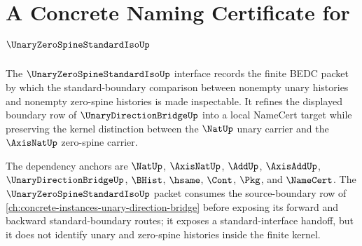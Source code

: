 \chapter{A Concrete Naming Certificate for $\UnaryZeroSpineStandardIsoUp$}
\label{ch:concrete-instances-unary-zero-spine-standard-iso-namecert}

The $\UnaryZeroSpineStandardIsoUp$ interface records the finite BEDC packet by which the standard-boundary comparison between nonempty unary histories and nonempty zero-spine histories is made inspectable. It refines the displayed boundary row of $\UnaryDirectionBridgeUp$ into a local NameCert target while preserving the kernel distinction between the $\NatUp$ unary carrier and the $\AxisNatUp$ zero-spine carrier.

The dependency anchors are $\NatUp$, $\AxisNatUp$, $\AddUp$, $\AxisAddUp$, $\UnaryDirectionBridgeUp$, $\BHist$, $\hsame$, $\Cont$, $\Pkg$, and $\NameCert$. The $\UnaryZeroSpineStandardIsoUp$ packet consumes the source-boundary row of \autoref{ch:concrete-instances-unary-direction-bridge} before exposing its forward and backward standard-boundary routes; it exposes a standard-interface handoff, but it does not identify unary and zero-spine histories inside the finite kernel.

